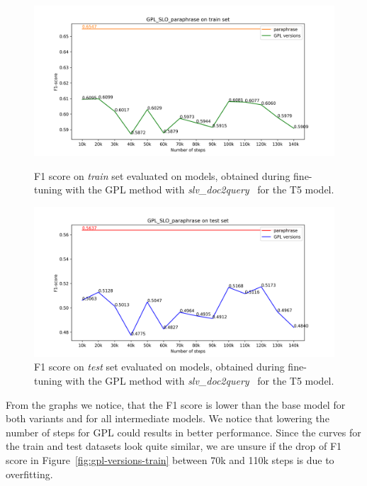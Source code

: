 \documentclass[fleqn,moreauthors,10pt]{ds_report}
\begin{document}
\begin{figure}
    \centering
    \begin{minipage}{0.5\textwidth}
        \centering
        \includegraphics[width=\linewidth]{graphs/GPL_SLO_paraphrase_train.png}
        \caption{F1 score on \textit{train} set evaluated on models, obtained during fine-tuning with the GPL method with {\it slv\_doc2query}~\cite{boshko} for the T5 model.}
		\label{fig:gpl-slo-versions-train}
    \end{minipage}\hfill
    \begin{minipage}{0.5\textwidth}
        \centering
        \includegraphics[width=\linewidth]{graphs/GPL_SLO_paraphrase_test.png}
        \caption{F1 score on \textit{test} set evaluated on models, obtained during fine-tuning with the GPL method with {\it slv\_doc2query}~\cite{boshko} for the T5 model.}
		\label{fig:gpl-slo-versions}
    \end{minipage}
\end{figure}

From the graphs we notice, that the F1 score is lower than the base model for both variants and for all intermediate models. We notice that lowering the number of steps for GPL could results in better performance. Since the curves for the train and test datasets look quite similar, we are unsure if the drop of F1 score in Figure~\ref{fig:gpl-versions-train} between 70k and 110k steps is due to overfitting.
\end{document}
